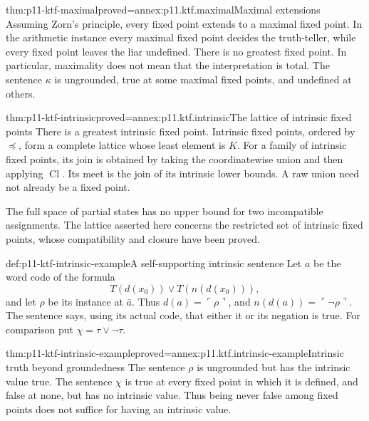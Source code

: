 \begin{hbtheorem}{thm:p11-ktf-maximal}{proved=annex:p11.ktf.maximal}{Maximal extensions}
Assuming Zorn's principle, every fixed point extends to a maximal fixed
point. In the arithmetic instance every maximal fixed point decides the
truth-teller, while every fixed point leaves the liar undefined. There is
no greatest fixed point. In particular, maximality does not mean that the
interpretation is total.
The sentence \(\kappa\) is ungrounded, true at some maximal fixed
points, and undefined at others.
\end{hbtheorem}

\begin{hbtheorem}{thm:p11-ktf-intrinsic}{proved=annex:p11.ktf.intrinsic}{The lattice of intrinsic fixed points}
There is a greatest intrinsic fixed point. Intrinsic fixed points, ordered
by \(\preceq\), form a complete lattice whose least element is \(K\).
For a family of intrinsic fixed points, its join is obtained by taking the
coordinatewise union and then applying \(\operatorname{Cl}\). Its meet
is the join of its intrinsic lower bounds. A raw union need not already
be a fixed point.
\end{hbtheorem}

The full space of partial states has no upper bound for two incompatible
assignments. The lattice asserted here concerns the restricted set of
intrinsic fixed points, whose compatibility and closure have been proved.

\begin{hbdefinition}{def:p11-ktf-intrinsic-example}{A self-supporting intrinsic sentence}
Let \(a\) be the word code of the formula
\[
 T(d(x_0))\lor T(n(d(x_0))),
\]
and let \(\rho\) be its instance at \(\bar a\). Thus
\(d(a)=\ulcorner\rho\urcorner\), and
\(n(d(a))=\ulcorner\neg\rho\urcorner\). The sentence says, using its
actual code, that either it or its negation is true. For comparison put
\(\chi=\tau\lor\neg\tau\).
\end{hbdefinition}

\begin{hbtheorem}{thm:p11-ktf-intrinsic-example}{proved=annex:p11.ktf.intrinsic-example}{Intrinsic truth beyond groundedness}
The sentence \(\rho\) is ungrounded but has the intrinsic value true.
The sentence \(\chi\) is true at every fixed point in which it is
defined, and false at none, but has no intrinsic value. Thus being never
false among fixed points does not suffice for having an intrinsic value.
\end{hbtheorem}

